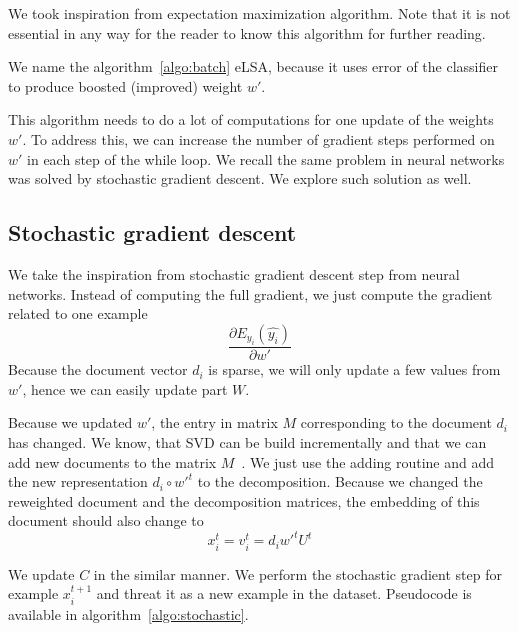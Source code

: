    We took inspiration from expectation maximization algorithm.  
    Note that it is not essential in any way for the reader to know this algorithm for further reading.
    
    We name the algorithm~\ref{algo:batch} eLSA, because it uses error of the classifier to produce boosted (improved) weight $w'$.
    
    This algorithm needs to do a lot of computations for one update of the weights $w'$.
    To address this, we can increase the number of gradient steps performed on $w'$ in each step of the while loop.
    We recall the same problem in neural networks was solved by stochastic gradient descent.
    We explore such solution as well.
    
    \subsection{Stochastic gradient descent}
    
    We take the inspiration from stochastic gradient descent step from neural networks.
    Instead of computing the full gradient, we just compute the gradient related to one example 
    $$\frac{\partial E_{y_i}(\hat{y_i})}{\partial w'}$$
    Because the document vector $d_i$ is sparse, we will only update a few values from $w'$, hence we can easily update part $W$.
    
    Because we updated $w'$, the entry in matrix $M$ corresponding to the document $d_i$ has changed.
    We know, that SVD can be build incrementally and that we can add new documents to the matrix $M$~\cite{brand2006fast}.
    We just use the adding routine and add the new representation $d_i \circ w'^{t}$ to the decomposition.
    Because we changed the reweighted document and the decomposition matrices,
    the embedding of this document should also change to 
    \begin{equation}
    x_i^{t} = v_i^{t} = d_i w'^{t} U^{t}
    \end{equation}
    
    We update $C$ in the similar manner.
    We perform the stochastic gradient step for example $x_i^{t+1}$ and threat it as a new example in the dataset.
    Pseudocode is available in algorithm~\ref{algo:stochastic}.
    
